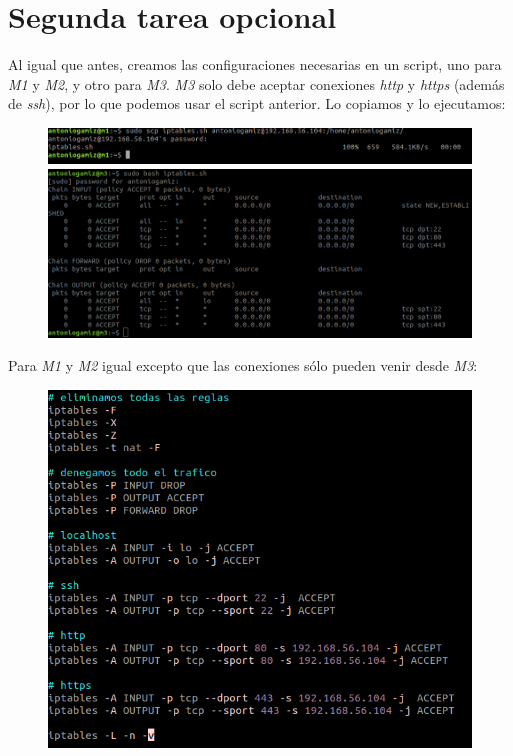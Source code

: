 \documentclass[12pt]{article}
\begin{document}
\section{Segunda tarea opcional}

Al igual que antes, creamos las configuraciones necesarias en un script, uno para \textit{M1} y \textit{M2}, y otro para \textit{M3}. \textit{M3} solo debe aceptar conexiones \textit{http} y \textit{https} (además de \textit{ssh}), por lo que podemos usar el script anterior. Lo copiamos y lo ejecutamos:

\begin{figure}[H]
\center
\includegraphics[scale=0.5,width=\textwidth]{22.png}
\includegraphics[scale=0.5,width=\textwidth]{23.png}
\end{figure}

Para \textit{M1} y \textit{M2} igual excepto que las conexiones sólo pueden venir desde \textit{M3}:

\begin{figure}[H]
\center
\includegraphics[scale=0.5]{26.png}
\end{figure}
\end{document}
